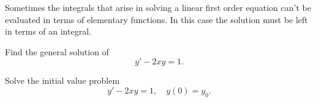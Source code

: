 
\noindent
Sometimes the integrals that arise in solving a linear first order equation can't be evaluated in
terms of elementary functions. In this case the solution must be left in terms of an integral.

\begin{example}
  \label{example:2.1.7}\rm \mbox{}
  \newline
  \begin{alist}
    \item %
    Find the general solution of
    \[
      y'-2xy=1.
    \]

    \item %
    Solve the initial value problem
    \begin{equation}
      \label{eq:2.1.28}y'-2xy=1,\quad y(0)=y_{0}.
    \end{equation}
  \end{alist}
\end{example}

